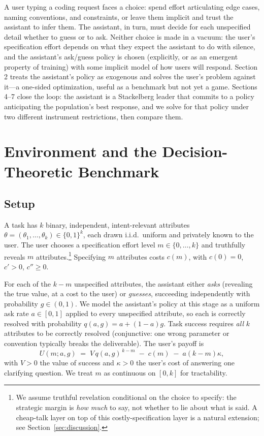 \documentclass[11pt]{article}
\begin{document}
A user typing a coding request faces a choice: spend effort articulating edge
cases, naming conventions, and constraints, or leave them implicit and trust the
assistant to infer them. The assistant, in turn, must decide for each unspecified
detail whether to guess or to ask. Neither choice is made in a vacuum: the user's
specification effort depends on what they expect the assistant to do with silence,
and the assistant's ask/guess policy is chosen (explicitly, or as an emergent
property of training) with some implicit model of how users will respond. Section 2
treats the assistant's policy as exogenous and solves the user's problem against
it---a one-sided optimization, useful as a benchmark but not yet a game. Sections
4--7 close the loop: the assistant is a Stackelberg leader that commits to a policy
anticipating the population's best response, and we solve for that policy under two
different instrument restrictions, then compare them.

\section{Environment and the Decision-Theoretic Benchmark}
\label{sec:baseline}

\subsection{Setup}

A task has $k$ binary, independent, intent-relevant attributes
$\theta = (\theta_1,\dots,\theta_k) \in \{0,1\}^k$, each drawn i.i.d.\ uniform and
privately known to the user. The user chooses a specification effort level
$m \in \{0,\dots,k\}$ and truthfully reveals $m$ attributes.\footnote{We assume
truthful revelation conditional on the choice to specify: the strategic margin is
\emph{how much} to say, not whether to lie about what is said. A cheap-talk layer
on top of this costly-specification layer is a natural extension; see
Section~\ref{sec:discussion}.} Specifying $m$ attributes costs $c(m)$, with
$c(0)=0$, $c' > 0$, $c'' \ge 0$.

For each of the $k-m$ unspecified attributes, the assistant either \emph{asks}
(revealing the true value, at a cost to the user) or \emph{guesses}, succeeding
independently with probability $g \in (0,1)$. We model the assistant's policy at
this stage as a uniform ask rate $a \in [0,1]$ applied to every unspecified
attribute, so each is correctly resolved with probability
$q(a,g) = a + (1-a)g$. Task success requires \emph{all} $k$ attributes to be
correctly resolved (conjunctive: one wrong parameter or convention typically breaks
the deliverable). The user's payoff is
\[
U(m; a, g) \;=\; V \, q(a,g)^{\,k-m} \;-\; c(m) \;-\; a(k-m)\kappa ,
\]
with $V>0$ the value of success and $\kappa>0$ the user's cost of answering one
clarifying question. We treat $m$ as continuous on $[0,k]$ for tractability.
\end{document}

